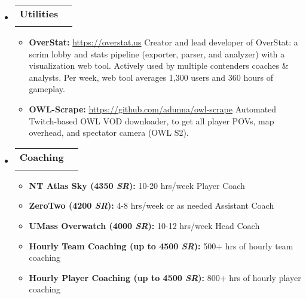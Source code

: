 \documentclass[letterpaper,11pt]{article}
\makeatletter
\newcommand{\resitem}[1]{\item #1 \vspace{-2pt}}
\newcommand{\resitemthree}[3]{\item[--] #1 \textit{#2} \vspace{-2pt} \null\hfill #3}
\newcommand{\ressubheading}[4]{
\begin{tabular*}{6.5in}{l@{\cftdotfill{\cftsecdotsep}\extracolsep{\fill}}r}
		\textbf{#1} & #2 \\
		\textit{#3} & \textit{#4} \\
\end{tabular*}\vspace{-6pt}}
\makeatother
\begin{document}
\begin{itemize}

\item[]

\ressubheading{Utilities}{}{}{}

\begin{itemize}
  \resitem{\textbf{OverStat:} \href{https://overstat.us}{https://overstat.us}}\newline\newline
  Creator and lead developer of OverStat: a scrim lobby and stats pipeline (exporter, parser, and analyzer) with a visualization web tool. Actively used by multiple contenders coaches \& analysts. Per week, web tool averages 1,300 users and 360 hours of gameplay.\newline
  \resitem{\textbf{OWL-Scrape:} \href{https://github.com/adunna/owl-scrape}{https://github.com/adunna/owl-scrape}}\newline\newline
  Automated Twitch-based OWL VOD downloader, to get all player POVs, map overhead, and spectator camera (OWL S2).
\end{itemize}

\item[]

\ressubheading{Coaching}{}{}{}

\begin{itemize}
  \resitemthree{\textbf{NT Atlas Sky (4350 \textit{SR}):} 10-20 hrs/week}{}{Player Coach}
  \resitemthree{\textbf{ZeroTwo (4200 \textit{SR}):} 4-8 hrs/week or as needed}{}{Assistant Coach}
  \resitemthree{\textbf{UMass Overwatch (4000 \textit{SR}):} 10-12 hrs/week}{}{Head Coach}
  \resitem{\textbf{Hourly Team Coaching (up to 4500 \textit{SR}):} 500+ hrs of hourly team coaching}
  \resitem{\textbf{Hourly Player Coaching (up to 4500 \textit{SR}):} 800+ hrs of hourly player coaching}
\end{itemize}




\end{itemize}
\end{document}

